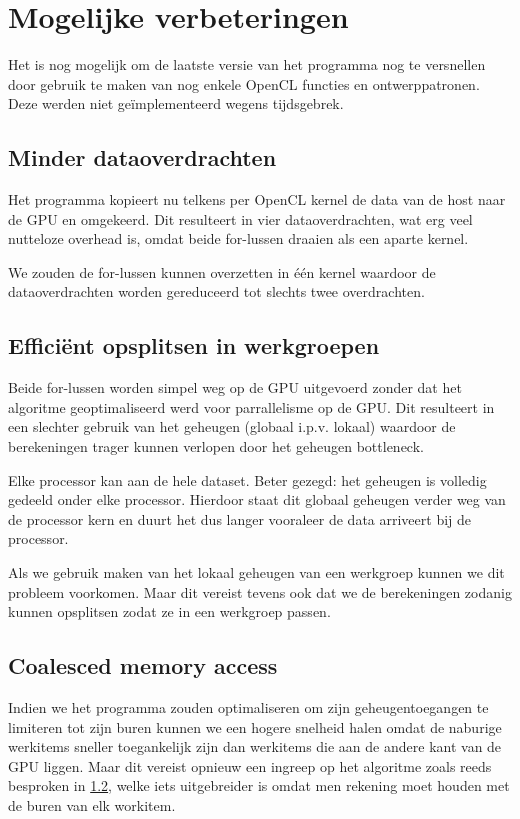 \documentclass{article}
\begin{document}
\section{Mogelijke verbeteringen}
Het is nog mogelijk om de laatste versie van het programma nog te versnellen door
gebruik te maken van nog enkele OpenCL functies en ontwerppatronen. Deze werden
niet ge\"{i}mplementeerd wegens tijdsgebrek.

\subsection{Minder dataoverdrachten}
\label{hfd:dataoverdrachten}
Het programma kopieert nu telkens per OpenCL kernel de data van de host naar de GPU en
omgekeerd. Dit resulteert in vier dataoverdrachten, wat erg veel nutteloze
overhead is, omdat beide for-lussen draaien als een aparte kernel.

We zouden de for-lussen kunnen overzetten in \'{e}\'{e}n kernel waardoor de dataoverdrachten
worden gereduceerd tot slechts twee overdrachten.

\subsection{Effici\"{e}nt opsplitsen in werkgroepen}
\label{hfd:werkgroepen}
Beide for-lussen worden simpel weg op de GPU uitgevoerd zonder dat het algoritme
geoptimaliseerd werd voor parrallelisme op de GPU. Dit resulteert in een slechter
gebruik van het geheugen (globaal i.p.v. lokaal) waardoor de berekeningen trager
kunnen verlopen door het geheugen bottleneck.

Elke processor kan aan de hele dataset. Beter gezegd: het geheugen is volledig
gedeeld onder elke processor. Hierdoor staat dit globaal geheugen verder weg
van de processor kern en duurt het dus langer vooraleer de data arriveert bij
de processor.

Als we gebruik maken van het lokaal geheugen van een werkgroep kunnen we dit probleem
voorkomen. Maar dit vereist tevens ook dat we de berekeningen zodanig kunnen opsplitsen
zodat ze in een werkgroep passen.

\subsection{Coalesced memory access}
Indien we het programma zouden optimaliseren om zijn geheugentoegangen te limiteren
tot zijn buren kunnen we een hogere snelheid halen omdat de naburige werkitems
sneller toegankelijk zijn dan werkitems die aan de andere kant van de GPU liggen.
Maar dit vereist opnieuw een ingreep op het algoritme zoals reeds besproken in
\ref{hfd:werkgroepen}, welke iets uitgebreider is omdat men rekening moet houden
met de buren van elk workitem.
\end{document}
